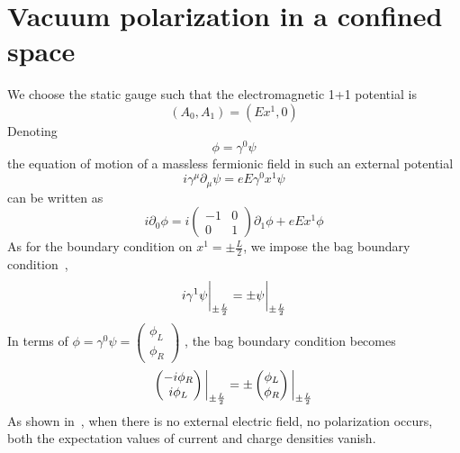 \section{Vacuum polarization in a confined space}\label{sect-nef}
We choose the static gauge such that the electromagnetic 1+1 potential is
\begin{equation*}
(A_0, A_1) = (E x^1, 0)
\end{equation*}
Denoting 
\begin{equation*}
\phi = \gamma^0\psi
\end{equation*} 
the equation of motion of a massless fermionic field in such an external potential 
\begin{equation*}
i\gamma^\mu\partial_\mu \psi = eE\gamma^0 x^1 \psi
\end{equation*}
can be written as
\begin{equation*}
i\partial_0\phi = i \begin{pmatrix} -1 & 0 \\ 0 & 1 \end{pmatrix}\partial_1\phi
+ eEx^1\phi
\end{equation*}
%
As for the boundary condition on $x^1 = \pm \frac L 2$, we impose the bag boundary condition~\cite{Chodos1974}, \ie 
\begin{equation*}
i\gamma^1 \psi \bigg\rvert_{\pm \frac{L}{2}} = \pm \psi \bigg\rvert_{\pm \frac{L}{2}}
\end{equation*}
In terms of $\phi = \gamma^0\psi = \begin{pmatrix} \phi_L \\ \phi_R \end{pmatrix}$
, the bag boundary condition becomes
\begin{equation}\label{vacuum-bagboundcond}
\begin{pmatrix}
-i \phi_R \\
i \phi_L
\end{pmatrix} \bigg\rvert_{\pm \frac{L}{2}} = \pm \begin{pmatrix}
\phi_L \\
\phi_R
\end{pmatrix} \bigg\rvert_{\pm \frac{L}{2}}
\end{equation}
%
As shown in~\cite{Zahn2015}, when there is no external electric field, no polarization occurs,
\ie both the expectation values of current and charge densities vanish. 

